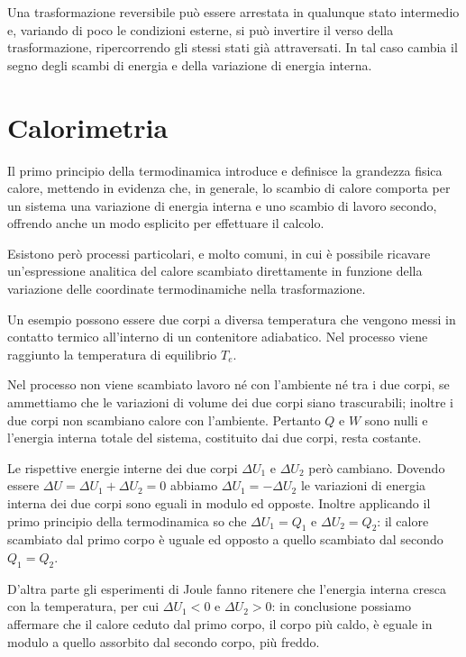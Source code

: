 \documentclass[class=book, crop=false, oneside, 12pt]{standalone}
\begin{document}
Una trasformazione reversibile può essere arrestata in qualunque stato intermedio e, variando di poco le condizioni esterne, si può invertire il verso della trasformazione, ripercorrendo gli stessi stati già attraversati.  
In tal caso cambia il segno degli scambi di energia e della variazione di energia interna.

\section{Calorimetria}
Il primo principio della termodinamica introduce e definisce la grandezza fisica calore, mettendo in evidenza che, in generale, lo scambio di calore comporta per un sistema una variazione di energia interna e uno scambio di lavoro secondo, offrendo anche un modo esplicito per effettuare il calcolo.

Esistono però processi particolari, e molto comuni, in cui è possibile ricavare un'espressione analitica del calore scambiato direttamente in funzione della variazione delle coordinate termodinamiche nella trasformazione.

Un esempio possono essere due corpi a diversa temperatura che vengono messi in contatto termico all'interno di un contenitore adiabatico. 
Nel processo viene raggiunto la temperatura di equilibrio \(T_e\).

Nel processo non viene scambiato lavoro né con l'ambiente né tra i due corpi, se ammettiamo che le variazioni di volume dei due corpi siano trascurabili; inoltre i due corpi non scambiano calore con l'ambiente. 
Pertanto \(Q\) e \(W\) sono nulli e l'energia interna totale del sistema, costituito dai due corpi, resta costante.

Le rispettive energie interne dei due corpi \(\Delta U_1\) e \(\Delta U_2\) però cambiano.
Dovendo essere \(\Delta U = \Delta U_1 + \Delta U_2 = 0\) abbiamo \(\Delta U_1 = - \Delta U_2\) le variazioni di energia interna dei due corpi sono eguali in modulo ed opposte.
Inoltre applicando il primo principio della termodinamica so che \(\Delta U_1 = Q_1\) e \(\Delta U_2 = Q_2\): il calore scambiato dal primo corpo è uguale ed opposto a quello scambiato dal secondo \(Q_1 = Q_2\).

D'altra parte gli esperimenti di Joule fanno ritenere che l'energia interna cresca con la temperatura, per cui \(\Delta U_1 < 0 \) e \(\Delta U_2 > 0 \):
in conclusione possiamo affermare che il calore ceduto dal primo corpo, il corpo più caldo, è eguale in modulo a quello assorbito dal secondo corpo, più freddo. 
\end{document}
